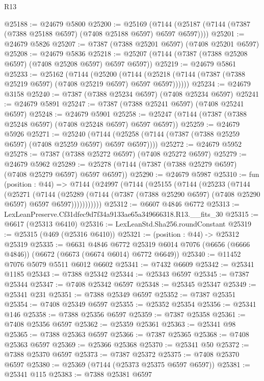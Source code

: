 \begin{lexlean}{R13}
\begin{coremodule}
@25188 := @24679 @5800
@25200 := @25169
    (@7144 (@25187 (@7144 (@7387 (@7388 @25188 @6597) (@7408 @25188 @6597) @6597 @6597))))
@25201 := @24679 @5826
@25207 := @7387 (@7388 @25201 @6597) (@7408 @25201 @6597)
@25208 := @24679 @5836
@25218 := @25207 (@7144 (@7387 (@7388 @25208 @6597) (@7408 @25208 @6597) @6597 @6597))
@25219 := @24679 @5861
@25233 := @25162
    (@7144
      (@25200
        (@7144 (@25218 (@7144 (@7387 (@7388 @25219 @6597) (@7408 @25219 @6597) @6597 @6597))))))
@25234 := @24679 @3158
@25240 := @7387 (@7388 @25234 @6597) (@7408 @25234 @6597)
@25241 := @24679 @5891
@25247 := @7387 (@7388 @25241 @6597) (@7408 @25241 @6597)
@25248 := @24679 @5901
@25258 := @25247 (@7144 (@7387 (@7388 @25248 @6597) (@7408 @25248 @6597) @6597 @6597))
@25259 := @24679 @5926
@25271 := @25240
    (@7144 (@25258 (@7144 (@7387 (@7388 @25259 @6597) (@7408 @25259 @6597) @6597 @6597))))
@25272 := @24679 @5952
@25278 := @7387 (@7388 @25272 @6597) (@7408 @25272 @6597)
@25279 := @24679 @5962
@25289 := @25278 (@7144 (@7387 (@7388 @25279 @6597) (@7408 @25279 @6597) @6597 @6597))
@25290 := @24679 @5987
@25310 := fun (position : @44) =>
  @7144
    (@24997
      (@7144
        (@25155
          (@7144
            (@25233
              (@7144
                (@25271
                  (@7144
                    (@25289
                      (@7144 (@7387 (@7388 @25290 @6597) (@7408 @25290 @6597) @6597 @6597)))))))))))
@25312 := @6607 @4846 @6772
@25313 := LexLeanPreserve.Cf31dfec9d7f34a9133ae65a349666318.R13.__fits_30
@25315 := @6617 (@25313 @6410)
@25316 := LexLeanStd.Sha256.roundConstant
@25319 := @25315 (@469 (@25316 @6410))
@25321 := (position : @44) -> @25312 @25319
@25335 := @6631
    @4846
    @6772
    @25319
    @6014
    @7076
    (@6656 (@6666 @4846))
    (@6672 (@6673 (@6674 @6014) @6772 @6649))
@25340 := @11452 @7076 @5079 @5511 @6012 @6602
@25341 := @7432 @6609
@25342 := @25341 @1185
@25343 := @7388 @25342
@25344 := @25343 @6597
@25345 := @7387 @25344
@25347 := @7408 @25342 @6597
@25348 := @25345 @25347
@25349 := @25341 @231
@25351 := @7388 @25349 @6597
@25352 := @7387 @25351
@25354 := @7408 @25349 @6597
@25355 := @25352 @25354
@25356 := @25341 @146
@25358 := @7388 @25356 @6597
@25359 := @7387 @25358
@25361 := @7408 @25356 @6597
@25362 := @25359 @25361
@25363 := @25341 @98
@25365 := @7388 @25363 @6597
@25366 := @7387 @25365
@25368 := @7408 @25363 @6597
@25369 := @25366 @25368
@25370 := @25341 @50
@25372 := @7388 @25370 @6597
@25373 := @7387 @25372
@25375 := @7408 @25370 @6597
@25380 := @25369 (@7144 (@25373 @25375 @6597 @6597))
@25381 := @25341 @115
@25383 := @7388 @25381 @6597

\end{coremodule}
\end{lexlean}
